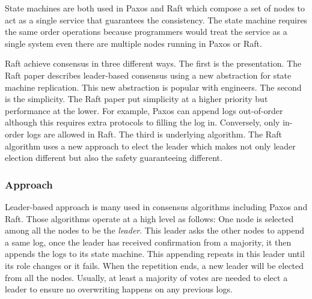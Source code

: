 \documentclass[12pt, a4paper]{article}
\begin{document}
State machines are both used in Paxos and Raft which compose a set of nodes
to act as a single service that guarantees the consistency.
The state machine requires the same order operations because
programmers would treat the service as a single system even there are
multiple nodes running in Paxos or Raft.

Raft achieve consensus in three different ways.
The first is the presentation. The Raft paper describes leader-based consensus
using a new abstraction for state machine replication.
This new abstraction is popular with engineers.
The second is the simplicity. The Raft paper put simplicity at a higher priority but
performance at the lower. For example, Paxos can append logs out-of-order
although this requires extra protocols to filling the log in.
Conversely, only in-order logs are allowed in Raft.
The third is underlying algorithm. The Raft algorithm uses a new approach to elect
the leader which makes not only leader election different
but also the safety guaranteeing different.

\subsubsection{Approach}
Leader-based approach is many used in consensus algorithms including Paxos and Raft.
Those algorithms operate at a high level as follows:
One node is selected among all the nodes to be the \textit{leader}.
This leader asks the other nodes to append a same log,
once the leader has received confirmation from a majority,
it then appends the logs to its state machine. This appending repeats in this leader until
its role changes or it fails.
When the repetition ends, a new leader will be elected from all the nodes.
Usually, at least a majority of votes are needed to elect a leader to
ensure no overwriting happens on any previous logs.
\end{document}
